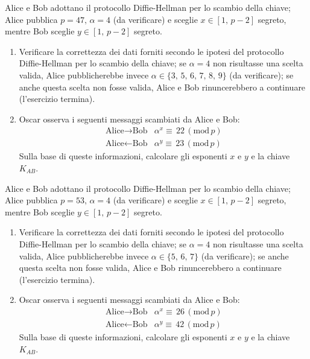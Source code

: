         Alice e Bob adottano il protocollo Diffie-Hellman per lo scambio della chiave; Alice pubblica 
        $p=47,\, \alpha=4$ (da verificare) e sceglie $x\in [1,\,p-2]$ segreto, mentre Bob sceglie $y\in [1,\,p-2]$ 
        segreto.
        \begin{enumerate}
            \item Verificare la correttezza dei dati forniti secondo le ipotesi del protocollo Diffie-Hellman 
                per lo scambio della chiave; se $\alpha=4$ non risultasse una scelta valida, Alice 
                pubblicherebbe invece $\alpha \in \{3,\,5,\,6,\,7,\,8,\,9\}$ (da verificare); se anche 
                questa scelta non fosse valida, Alice e Bob rinuncerebbero a continuare (l'esercizio termina).
            \item Oscar osserva i seguenti messaggi scambiati da Alice e Bob: \[
            \begin{array}{ll}
                \text{Alice} \rightarrow \text{Bob} & \alpha^{x} \equiv\,22\,(\mathrm{mod}\,p)\\
                \text{Alice} \leftarrow \text{Bob} & \alpha^{y} \equiv\,23\,(\mathrm{mod}\,p)
            \end{array}
            \] Sulla base di queste informazioni, calcolare gli esponenti $x$ e $y$ e la chiave $K_{AB}$.
        \end{enumerate}

        Alice e Bob adottano il protocollo Diffie-Hellman per lo scambio della chiave; Alice pubblica 
        $p=53,\, \alpha=4$ (da verificare) e sceglie $x\in [1,\,p-2]$ segreto, mentre Bob sceglie $y\in [1,\,p-2]$ 
        segreto.
        \begin{enumerate}
            \item Verificare la correttezza dei dati forniti secondo le ipotesi del protocollo Diffie-Hellman 
                per lo scambio della chiave; se $\alpha=4$ non risultasse una scelta valida, Alice 
                pubblicherebbe invece $\alpha \in \{5,\,6,\,7\}$ (da verificare); se anche questa scelta 
                non fosse valida, Alice e Bob rinuncerebbero a continuare (l'esercizio termina).
            \item Oscar osserva i seguenti messaggi scambiati da Alice e Bob: \[
            \begin{array}{ll}
                \text{Alice} \rightarrow \text{Bob} & \alpha^{x} \equiv\,26\,(\mathrm{mod}\,p)\\
                \text{Alice} \leftarrow \text{Bob} & \alpha^{y} \equiv\,42\,(\mathrm{mod}\,p)
            \end{array}
            \] Sulla base di queste informazioni, calcolare gli esponenti $x$ e $y$ e la chiave $K_{AB}$.
        \end{enumerate}

